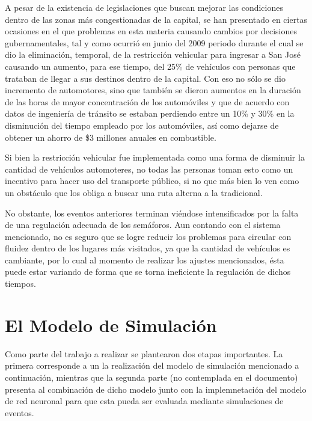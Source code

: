 \documentclass[12pt,journal,compsoc]{IEEEtran}
\begin{document}
		A pesar de la existencia de legislaciones que buscan mejorar las condiciones dentro de las zonas m\'{a}s congestionadas de la capital, se han presentado en ciertas ocasiones en el que problemas en esta materia causando cambios por decisiones gubernamentales, tal y como ocurri\'{o} en junio del 2009 periodo durante el cual se dio la eliminaci\'{o}n, temporal, de la restricci\'{o}n vehicular para
	ingresar a San Jos\'{e} causando un aumento, para ese tiempo, del 25\% de
	veh\'{i}culos con personas que trataban de llegar a sus destinos dentro de la
	capital. Con eso no s\'{o}lo se dio incremento de automotores, sino que
	tambi\'{e}n se dieron aumentos en la duraci\'{o}n de las horas de mayor
	concentraci\'{o}n de los autom\'{o}viles y que de acuerdo con datos de
	ingenier\'{i}a de tr\'{a}nsito se estaban perdiendo entre un 10\% y 30\% en la
	disminuci\'{o}n del tiempo empleado por los autom\'{o}viles, as\'{i} como
	dejarse de obtener un ahorro de \$3 millones anuales en combustible.\cite{Mata2009}
		
		Si bien la restricci\'{o}n vehicular fue implementada como una forma de disminuir la cantidad de veh\'{i}culos automoteres, no todas las personas toman esto como un incentivo para hacer uso del transporte p\'{u}blico, si no que m\'{a}s bien lo ven como un obst\'{a}culo que los obliga a buscar una ruta alterna a la tradicional.
		
		No obstante, los eventos anteriores terminan vi\'{e}ndose intensificados  por la
	falta de una regulaci\'{o}n adecuada de los sem\'{a}foros. Aun contando con el sistema
	mencionado, no es seguro que se logre reducir los problemas para circular con
	fluidez dentro de los lugares m\'{a}s visitados, ya que la cantidad de veh\'{i}culos es
	cambiante, por lo cual al momento de realizar los ajustes mencionados, \'{e}sta puede estar variando de forma que se torna ineficiente la regulaci\'{o}n de dichos tiempos.

\section{El Modelo de Simulaci\'{o}n}
Como parte del trabajo a realizar se plantearon dos etapas importantes. La primera corresponde a un la realizaci\'{o}n del modelo de simulaci\'{o}n mencionado a continuaci\'{o}n, mientras que la segunda parte (no contemplada en el documento) presenta al combinaci\'{o}n de dicho modelo junto con la implemnetaci\'{o}n del modelo de red neuronal para que esta pueda ser evaluada mediante simulaciones de eventos.
\end{document}
